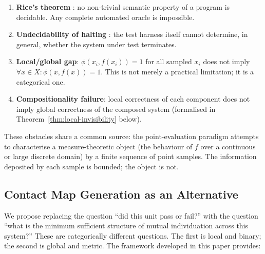\documentclass[12pt,a4paper,twocolumn]{article}
\theoremstyle{plain}
\theoremstyle{definition}
\theoremstyle{remark}
\begin{document}
\begin{enumerate}[label=(\roman*)]
\item \textbf{Rice's theorem} \citep{rice1953classes}: no non-trivial semantic
  property of a program is decidable.  Any complete automated oracle is
  impossible.

\item \textbf{Undecidability of halting} \citep{turing1936computable}: the
  test harness itself cannot determine, in general, whether the system under
  test terminates.

\item \textbf{Local/global gap}: $\phi(x_i, f(x_i)) = 1$ for all sampled
  $x_i$ does not imply $\forall x \in X\!: \phi(x,f(x)) = 1$.  This is not
  merely a practical limitation; it is a categorical one.

\item \textbf{Compositionality failure}: local correctness of each component
  does not imply global correctness of the composed system (formalised in
  Theorem~\ref{thm:local-invisibility} below).
\end{enumerate}

These obstacles share a common source: the point-evaluation paradigm attempts
to characterise a measure-theoretic object (the behaviour of $f$ over a
continuous or large discrete domain) by a finite sequence of point samples.
The information deposited by each sample is bounded; the object is not.

\subsection{Contact Map Generation as an Alternative}

We propose replacing the question ``did this unit pass or fail?'' with the
question ``what is the minimum sufficient structure of mutual individuation
across this system?''  These are categorically different questions.  The
first is local and binary; the second is global and metric.  The framework
developed in this paper provides:
\end{document}
